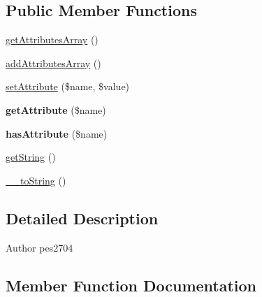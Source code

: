 \subsection*{Public Member Functions}
\begin{DoxyCompactItemize}
\item 
\mbox{\hyperlink{interface_pes_1_1_dom_1_1_node_1_1_attributes_1_1_attributes_interface_a777187fb39c10ae49a97e9bd1878bf0f}{get\+Attributes\+Array}} ()
\item 
\mbox{\hyperlink{interface_pes_1_1_dom_1_1_node_1_1_attributes_1_1_attributes_interface_abce78ec74275a454ab6b67b16e030bc8}{add\+Attributes\+Array}} ()
\item 
\mbox{\hyperlink{interface_pes_1_1_dom_1_1_node_1_1_attributes_1_1_attributes_interface_a545f43e4d937e0e272a4bafe8b411d55}{set\+Attribute}} (\$name, \$value)
\item 
\mbox{\label{interface_pes_1_1_dom_1_1_node_1_1_attributes_1_1_attributes_interface_ae954da422d40fc286691e54679e44c6f}} 
{\bfseries get\+Attribute} (\$name)
\item 
\mbox{\label{interface_pes_1_1_dom_1_1_node_1_1_attributes_1_1_attributes_interface_ac78ba27a41d0291c61326022489d4986}} 
{\bfseries has\+Attribute} (\$name)
\item 
\mbox{\hyperlink{interface_pes_1_1_dom_1_1_node_1_1_attributes_1_1_attributes_interface_afde980915cc78c408e6ac75b662e631c}{get\+String}} ()
\item 
\mbox{\hyperlink{interface_pes_1_1_dom_1_1_node_1_1_attributes_1_1_attributes_interface_a7516ca30af0db3cdbf9a7739b48ce91d}{\+\_\+\+\_\+to\+String}} ()
\end{DoxyCompactItemize}


\subsection{Detailed Description}
\begin{DoxyAuthor}{Author}
pes2704 
\end{DoxyAuthor}


\subsection{Member Function Documentation}
\mbox{\label{interface_pes_1_1_dom_1_1_node_1_1_attributes_1_1_attributes_interface_a7516ca30af0db3cdbf9a7739b48ce91d}} 

